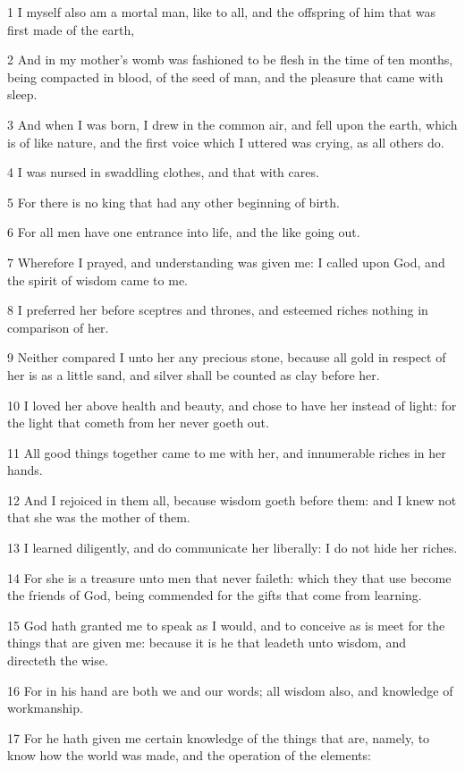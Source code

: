 \par 1 I myself also am a mortal man, like to all, and the offspring of him that was first made of the earth,
\par 2 And in my mother's womb was fashioned to be flesh in the time of ten months, being compacted in blood, of the seed of man, and the pleasure that came with sleep.
\par 3 And when I was born, I drew in the common air, and fell upon the earth, which is of like nature, and the first voice which I uttered was crying, as all others do.
\par 4 I was nursed in swaddling clothes, and that with cares.
\par 5 For there is no king that had any other beginning of birth.
\par 6 For all men have one entrance into life, and the like going out.
\par 7 Wherefore I prayed, and understanding was given me: I called upon God, and the spirit of wisdom came to me.
\par 8 I preferred her before sceptres and thrones, and esteemed riches nothing in comparison of her.
\par 9 Neither compared I unto her any precious stone, because all gold in respect of her is as a little sand, and silver shall be counted as clay before her.
\par 10 I loved her above health and beauty, and chose to have her instead of light: for the light that cometh from her never goeth out.
\par 11 All good things together came to me with her, and innumerable riches in her hands.
\par 12 And I rejoiced in them all, because wisdom goeth before them: and I knew not that she was the mother of them.
\par 13 I learned diligently, and do communicate her liberally: I do not hide her riches.
\par 14 For she is a treasure unto men that never faileth: which they that use become the friends of God, being commended for the gifts that come from learning.
\par 15 God hath granted me to speak as I would, and to conceive as is meet for the things that are given me: because it is he that leadeth unto wisdom, and directeth the wise.
\par 16 For in his hand are both we and our words; all wisdom also, and knowledge of workmanship.
\par 17 For he hath given me certain knowledge of the things that are, namely, to know how the world was made, and the operation of the elements:
